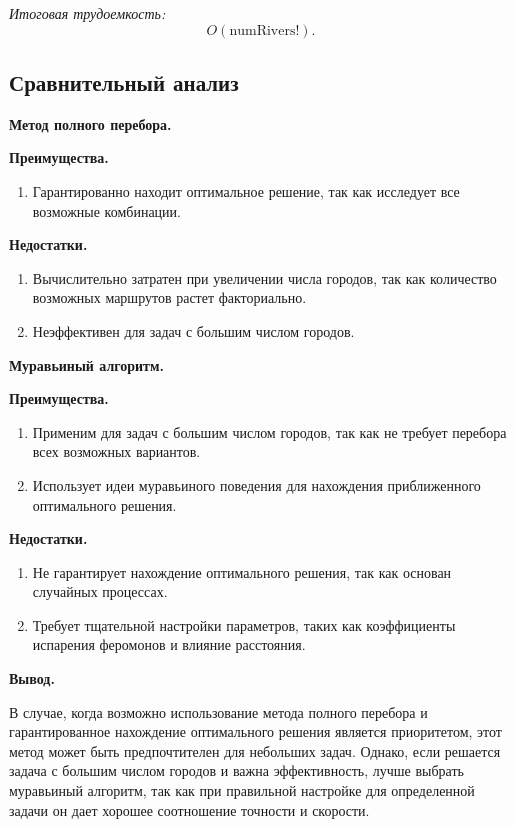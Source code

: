 \documentclass[12pt, a4paper]{article}
\begin{document}
\textit{Итоговая трудоемкость:} 
\[O(\text{{numRivers}}!).\]
\newpage
\subsection{Сравнительный анализ}
\textbf{Метод полного перебора.}

\textbf{Преимущества.}
\begin{enumerate}
  \item Гарантированно находит оптимальное решение, так как исследует все возможные комбинации.
\end{enumerate}

\textbf{Недостатки.}
\begin{enumerate}
  \item Вычислительно затратен при увеличении числа городов, так как количество возможных маршрутов растет факториально.
  \item Неэффективен для задач с большим числом городов.
\end{enumerate}

\textbf{Муравьиный алгоритм.}

\textbf{Преимущества.}
\begin{enumerate}
  \item Применим для задач с большим числом городов, так как не требует перебора всех возможных вариантов.
  \item Использует идеи муравьиного поведения для нахождения приближенного оптимального решения.
\end{enumerate}

\textbf{Недостатки.}
\begin{enumerate}
  \item Не гарантирует нахождение оптимального решения, так как основан 
  случайных процессах.
  \item Требует тщательной настройки параметров, таких как коэффициенты испарения феромонов и влияние расстояния.
\end{enumerate}


\textbf{Вывод.}

В случае, когда возможно использование метода полного перебора и 
гарантированное нахождение оптимального решения является приоритетом, 
этот метод может быть предпочтителен для небольших задач. Однако, если 
решается задача с большим числом городов и важна эффективность, 
лучше выбрать муравьиный алгоритм, так как при правильной настройке для 
определенной задачи он дает хорошее соотношение точности и скорости. 
\end{document}
